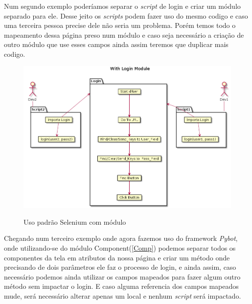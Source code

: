     \clearpage

    Num segundo exemplo poderíamos separar o \emph{script} de login e criar um módulo separado para ele. Desse jeito
    os \emph{scripts} podem fazer uso do mesmo codigo e caso uma terceira pessoa precise dele não seria um problema.
    Porém temos todo o mapeamento dessa página preso num módulo e caso seja necessário a criação de outro
    módulo que use esses campos ainda assim teremos que duplicar mais codigo.

    \begin{figure}[H]
        \vspace*{0,3cm}
        \centering
        \caption{Uso padrão Selenium com módulo}
        \includegraphics[width=1\textwidth]{./04-figuras/page_object_module}
        \label{fig:selenium_module}
    \end{figure}

    \clearpage
    Chegando num terceiro exemplo onde agora fazemos uso do framework \emph{Pybot}, onde utilizando-se do
    módulo Component(\ref{Comp}) podemos separar todos os componentes da tela em atributos da nossa página
    e criar um método onde precisando de dois parâmetros ele faz o processo de login, e ainda assim, caso
    necessário podemos ainda utilizar os campos mapeados para fazer algum outro método sem impactar o login.
    E caso alguma referencia dos campos mapeados mude, será necessário alterar apenas um local e nenhum \emph{script}
    será impactado.

